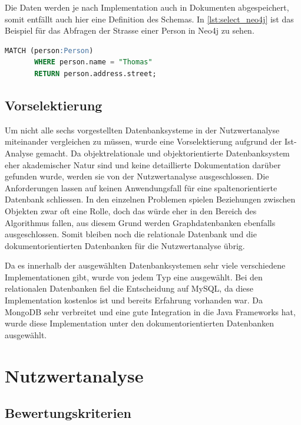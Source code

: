 Die Daten werden je nach Implementation auch in Dokumenten abgespeichert, somit entfällt auch hier eine Definition des Schemas. In \autoref{lst:select_neo4j} ist das Beispiel 
für das Abfragen der Strasse einer Person in Neo4j zu sehen.

\begin{lstlisting}[language=SQL, caption=Abfrage in Neo4j, label=lst:select_neo4j]  
       MATCH (person:Person)
       WHERE person.name = "Thomas"
       RETURN person.address.street;
\end{lstlisting}

\subsection{Vorselektierung}\label{preselection}
Um nicht alle sechs vorgestellten Datenbanksysteme in der Nutzwertanalyse miteinander vergleichen zu müssen, wurde eine Vorselektierung aufgrund der Ist-Analyse gemacht. Da 
objektrelationale und objektorientierte Datenbanksystem eher akademischer Natur sind und keine detaillierte Dokumentation darüber gefunden wurde, werden sie von der Nutzwertanalyse 
ausgeschlossen. Die Anforderungen lassen auf keinen Anwendungsfall für eine spaltenorientierte Datenbank schliessen. In den einzelnen Problemen spielen Beziehungen zwischen Objekten 
zwar oft eine Rolle, doch das würde eher in den Bereich des Algorithmus fallen, aus diesem Grund werden Graphdatenbanken ebenfalls ausgeschlossen. Somit bleiben noch die relationale 
Datenbank und die dokumentorientierten Datenbanken für die Nutzwertanalyse übrig.

Da es innerhalb der ausgewählten Datenbanksystemen sehr viele verschiedene Implementationen gibt, wurde von jedem Typ eine ausgewählt. Bei den relationalen Datenbanken fiel die 
Entscheidung auf MySQL, da diese Implementation kostenlos ist und bereits Erfahrung vorhanden war. Da MongoDB sehr verbreitet und eine gute Integration in die Java Frameworks hat, 
wurde diese Implementation unter den dokumentorientierten Datenbanken ausgewählt.

\newpage
\section{Nutzwertanalyse}\label{architektur_nutzwertanalyse}

\subsection{Bewertungskriterien}\label{architektur_bewertungspunkte}

